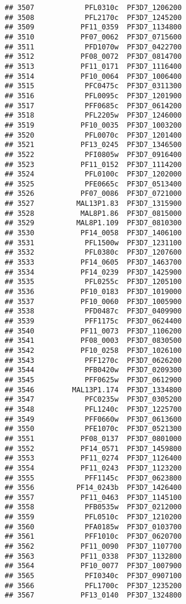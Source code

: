 \documentclass[12pt, a4paper]{article}\usepackage[]{graphicx}\usepackage[]{color}
\makeatletter
\newenvironment{kframe}{%
 \def\at@end@of@kframe{}%
 \ifinner\ifhmode%
  \def\at@end@of@kframe{\end{minipage}}%
  \begin{minipage}{\columnwidth}%
 \fi\fi%
 \def\FrameCommand##1{\hskip\@totalleftmargin \hskip-\fboxsep
 \colorbox{shadecolor}{##1}\hskip-\fboxsep
     \hskip-\linewidth \hskip-\@totalleftmargin \hskip\columnwidth}%
 \MakeFramed {\advance\hsize-\width
   \@totalleftmargin\z@ \linewidth\hsize
   \@setminipage}}%
 {\par\unskip\endMakeFramed%
 \at@end@of@kframe}
\newenvironment{knitrout}{}{} %
\makeatother
\begin{document}
\begin{knitrout}
\begin{kframe}
\begin{verbatim}
## 3507            PFL0310c  PF3D7_1206200
## 3508            PFL2170c  PF3D7_1245200
## 3509           PF11_0359  PF3D7_1134800
## 3510           PF07_0062  PF3D7_0715600
## 3511            PFD1070w  PF3D7_0422700
## 3512           PF08_0072  PF3D7_0814700
## 3513           PF11_0171  PF3D7_1116400
## 3514           PF10_0064  PF3D7_1006400
## 3515            PFC0475c  PF3D7_0311300
## 3516            PFL0095c  PF3D7_1201900
## 3517            PFF0685c  PF3D7_0614200
## 3518            PFL2205w  PF3D7_1246000
## 3519           PF10_0035  PF3D7_1003200
## 3520            PFL0070c  PF3D7_1201400
## 3521           PF13_0245  PF3D7_1346500
## 3522            PFI0805w  PF3D7_0916400
## 3523           PF11_0152  PF3D7_1114200
## 3524            PFL0100c  PF3D7_1202000
## 3525            PFE0665c  PF3D7_0513400
## 3526           PF07_0086  PF3D7_0721000
## 3527          MAL13P1.83  PF3D7_1315900
## 3528           MAL8P1.86  PF3D7_0815000
## 3529          MAL8P1.109  PF3D7_0810300
## 3530           PF14_0058  PF3D7_1406100
## 3531            PFL1500w  PF3D7_1231100
## 3532            PFL0380c  PF3D7_1207600
## 3533           PF14_0605  PF3D7_1463700
## 3534           PF14_0239  PF3D7_1425900
## 3535            PFL0255c  PF3D7_1205100
## 3536           PF10_0183  PF3D7_1019000
## 3537           PF10_0060  PF3D7_1005900
## 3538            PFD0487c  PF3D7_0409900
## 3539            PFF1175c  PF3D7_0624400
## 3540           PF11_0073  PF3D7_1106200
## 3541           PF08_0003  PF3D7_0830500
## 3542           PF10_0258  PF3D7_1026100
## 3543            PFF1270c  PF3D7_0626200
## 3544            PFB0420w  PF3D7_0209300
## 3545            PFF0625w  PF3D7_0612900
## 3546         MAL13P1.174  PF3D7_1334800
## 3547            PFC0235w  PF3D7_0305200
## 3548            PFL1240c  PF3D7_1225700
## 3549            PFF0660w  PF3D7_0613600
## 3550            PFE1070c  PF3D7_0521300
## 3551           PF08_0137  PF3D7_0801000
## 3552           PF14_0571  PF3D7_1459800
## 3553           PF11_0274  PF3D7_1126400
## 3554           PF11_0243  PF3D7_1123200
## 3555            PFF1145c  PF3D7_0623800
## 3556          PF14_0243b  PF3D7_1426400
## 3557           PF11_0463  PF3D7_1145100
## 3558            PFB0535w  PF3D7_0212000
## 3559            PFL0510c  PF3D7_1210200
## 3560            PFA0185w  PF3D7_0103700
## 3561            PFF1010c  PF3D7_0620700
## 3562           PF11_0090  PF3D7_1107700
## 3563           PF11_0338  PF3D7_1132800
## 3564           PF10_0077  PF3D7_1007900
## 3565            PFI0340c  PF3D7_0907100
## 3566            PFL1700c  PF3D7_1235200
## 3567           PF13_0140  PF3D7_1324800

\end{verbatim}
\end{kframe}
\end{knitrout}
\end{document}
